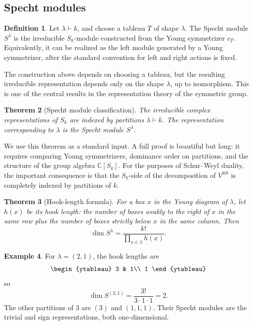 \documentclass[12pt,a4paper]{article}
\newtheorem{theorem}{Theorem}[section]
\theoremstyle{definition}
\newtheorem{definition}[theorem]{Definition}
\newtheorem{example}[theorem]{Example}
\theoremstyle{remark}
\newcommand{\C}{\mathbb{C}}
\begin{document}
\subsection{Specht modules}

\begin{definition}
Let \(\lambda\vdash k\), and choose a tableau \(T\) of shape \(\lambda\).  The
Specht module \(S^\lambda\) is the irreducible \(S_k\)-module constructed
from the Young symmetrizer \(c_T\).  Equivalently, it can be realized as the
left module generated by a Young symmetrizer, after the standard convention
for left and right actions is fixed.
\end{definition}

The construction above depends on choosing a tableau, but the resulting
irreducible representation depends only on the shape \(\lambda\), up to
isomorphism.  This is one of the central results in the representation theory
of the symmetric group.

\begin{theorem}[Specht module classification]
The irreducible complex representations of \(S_k\) are indexed by partitions
\(\lambda\vdash k\).  The representation corresponding to \(\lambda\) is the
Specht module \(S^\lambda\).
\end{theorem}

We use this theorem as a standard input.  A full proof is beautiful but long:
it requires comparing Young symmetrizers, dominance order on partitions, and
the structure of the group algebra \(\C[S_k]\).  For the purposes of
Schur--Weyl duality, the important consequence is that the \(S_k\)-side of
the decomposition of \(V^{\otimes k}\) is completely indexed by partitions of
\(k\).

\begin{theorem}[Hook-length formula]
For a box \(x\) in the Young diagram of \(\lambda\), let \(h(x)\) be its hook
length: the number of boxes weakly to the right of \(x\) in the same row plus
the number of boxes strictly below \(x\) in the same column.  Then
\[
\dim S^\lambda
  =\frac{k!}{\prod_{x\in\lambda}h(x)}.
\]
\end{theorem}

\begin{example}
For \(\lambda=(2,1)\), the hook lengths are
\[
\begin{ytableau}
3 & 1\\
1
\end{ytableau}
\]
so
\[
\dim S^{(2,1)}=\frac{3!}{3\cdot 1\cdot 1}=2.
\]
The other partitions of \(3\) are \((3)\) and \((1,1,1)\).  Their Specht
modules are the trivial and sign representations, both one-dimensional.
\end{example}
\end{document}
